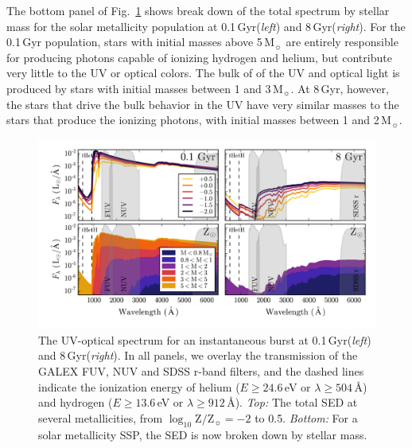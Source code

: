\documentclass[preprint2]{aastex62}
\newcommand\Msun{\ensuremath{\,\mathrm{M_{\sun}}}\xspace}
\newcommand{\logten}{\ensuremath{\log_{10}}}
\newcommand{\logZeq}[1]{\ensuremath{\logten \mathrm{Z}/\mathrm{Z}_{\sun} = #1}}
\newcommand{\ang}{\ensuremath{\mbox{\AA}}\xspace}
\newcommand{\Gyr}{$\,$Gyr\xspace}
\begin{document}
The bottom panel of Fig.~\ref{fig:ionSpec} shows break down of the total spectrum by stellar mass for the solar metallicity population at 0.1\Gyr (\emph{left}) and 8\Gyr (\emph{right}). For the 0.1\Gyr population, stars with initial masses above 5\Msun are entirely responsible for producing photons capable of ionizing hydrogen and helium, but contribute very little to the UV or optical colors. The bulk of of the UV and optical light is produced by stars with initial masses between 1 and 3\Msun. At 8\Gyr, however, the stars that drive the bulk behavior in the UV have very similar masses to the stars that produce the ionizing photons, with initial masses between 1 and 2\Msun.
\begin{figure}
  \begin{center}
    \includegraphics[width=\linewidth]{figs/f1.png}
    \caption{The UV-optical spectrum for an instantaneous burst at 0.1\Gyr (\emph{left}) and 8\Gyr (\emph{right}). In all panels, we overlay the transmission of the GALEX FUV, NUV and SDSS r-band filters, and the dashed lines indicate the ionization energy of helium ($E\geq24.6\,$eV or $\lambda \geq 504\,$\ang) and hydrogen ($E\geq13.6\,$eV or $\lambda \geq 912\,$\ang). \emph{Top:} The total SED at several metallicities, from \logZeq{-2} to 0.5. \emph{Bottom:} For a solar metallicity SSP, the SED is now broken down by stellar mass.}
    \label{fig:ionSpec}
  \end{center}
\end{figure}
\end{document}
